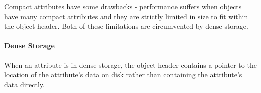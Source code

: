 Compact attributes have some drawbacks - performance suffers when objects have many compact attributes and they are strictly limited in size to fit within the object header.  Both of these limitations are circumvented by dense storage. 

\paragraph{Dense Storage} When an attribute is in dense storage, the object header contains a pointer to the location of the attribute's data on disk rather than containing the attribute's data directly.

